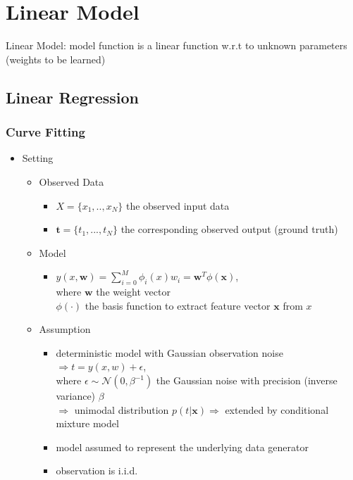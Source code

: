 \chapter{Linear Model}
Linear Model: model function is a linear function w.r.t to unknown parameters (weights to be learned)

\section{Linear Regression}

\subsection{Curve Fitting}
\begin{itemize}
\item Setting
	\begin{itemize}
	\item Observed Data
		\begin{itemize}
		\item $X=\{x_1,..,x_N\}$ the observed input data
		\item $\mathbf t=\{t_1,...,t_N\}$ the corresponding observed output (ground truth)
		\end{itemize}
	\item Model
		\begin{itemize}
		\item $\displaystyle y(x,\mathbf w)=\sum_{i=0}^{M}\phi_i(x)w_i = \mathbf w^T \phi(\mathbf x)$, \\
		where $\mathbf w$ the weight vector \\
		\phantom{where} $\phi(\cdot)$ the basis function to extract feature vector $\mathbf x$ from $x$
		\end{itemize}
	\item Assumption
		\begin{itemize}
		\item deterministic model with Gaussian observation noise $\Rightarrow t=y(x,w)+\epsilon$, \\
		where $\epsilon \sim \mathcal N(0,\beta^{-1})$ the Gaussian noise with precision (inverse variance) $\beta$ \\
		$\Rightarrow$ unimodal distribution $p(t|\mathbf x) \Rightarrow$ extended by conditional mixture model
		\item model assumed to represent the underlying data generator
		\item observation is i.i.d.
		\end{itemize}

\end{itemize}
\end{itemize}
